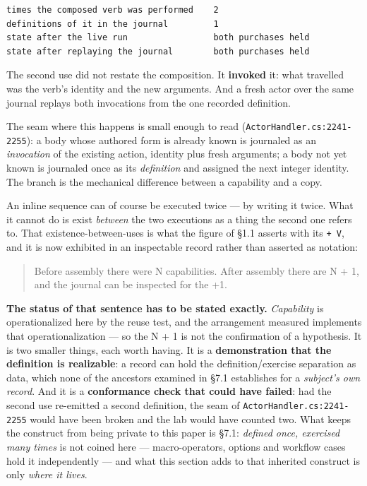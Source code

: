 \documentclass[
]{article}
\newcounter{none} %
\begin{document}
\begin{verbatim}
times the composed verb was performed    2
definitions of it in the journal         1
state after the live run                 both purchases held
state after replaying the journal        both purchases held
\end{verbatim}

The second use did not restate the composition. It \textbf{invoked} it:
what travelled was the verb's identity and the new arguments. And a
fresh actor over the same journal replays both invocations from the one
recorded definition.

The seam where this happens is small enough to read
(\texttt{ActorHandler.cs:2241-2255}): a body whose authored form is
already known is journaled as an \emph{invocation} of the existing
action, identity plus fresh arguments; a body not yet known is journaled
once as its \emph{definition} and assigned the next integer identity.
The branch is the mechanical difference between a capability and a copy.

An inline sequence can of course be executed twice --- by writing it
twice. What it cannot do is exist \emph{between} the two executions as a
thing the second one refers to. That existence-between-uses is what the
figure of §1.1 asserts with its \texttt{+\ V}, and it is now exhibited
in an inspectable record rather than asserted as notation:

\begin{quote}
Before assembly there were N capabilities. After assembly there are N +
1, and the journal can be inspected for the +1.
\end{quote}

\textbf{The status of that sentence has to be stated exactly.}
\emph{Capability} is operationalized here by the reuse test, and the
arrangement measured implements that operationalization --- so the N + 1
is not the confirmation of a hypothesis. It is two smaller things, each
worth having. It is a \textbf{demonstration that the definition is
realizable}: a record can hold the definition/exercise separation as
data, which none of the ancestors examined in §7.1 establishes for a
\emph{subject's own record}. And it is a \textbf{conformance check that
could have failed}: had the second use re-emitted a second definition,
the seam of \texttt{ActorHandler.cs:2241-2255} would have been broken
and the lab would have counted two. What keeps the construct from being
private to this paper is §7.1: \emph{defined once, exercised many times}
is not coined here --- macro-operators, options and workflow cases hold
it independently --- and what this section adds to that inherited
construct is only \emph{where it lives}.
\end{document}
